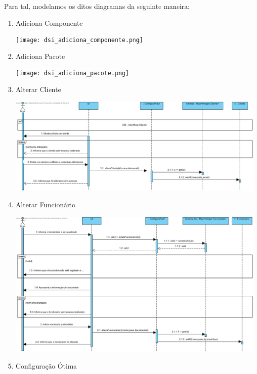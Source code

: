 \documentclass[11pt]{article} %
\begin{document}
Para tal, modelamos os ditos diagramas da seguinte maneira:
\begin{enumerate}
	\item Adiciona Componente
		\begin{center}
 			\texttt{[image: dsi\_adiciona\_componente.png]}
		\end{center}
	\item Adiciona Pacote
		\begin{center}
 			\texttt{[image: dsi\_adiciona\_pacote.png]}
		\end{center}\newpage
	\item Alterar Cliente
		\begin{center}
 			\includegraphics[]{dsi_alterar_cliente.png}
		\end{center}
	\item Alterar Funcionário
		\begin{center}
 			\includegraphics[]{dsi_alterar_funcionario.png}
		\end{center}\newpage
	\item Configuração Ótima
		\begin{center}

\end{center}
\end{enumerate}
\end{document}
